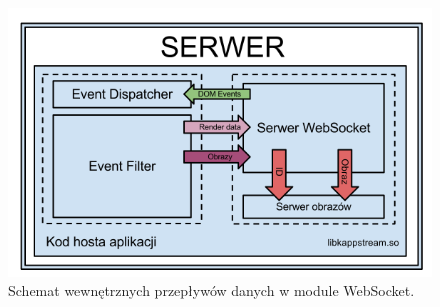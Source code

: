 
\begin{figure}[H]
\centering
\includegraphics[width=0.8\linewidth]{img/arch-lib}
\caption{Schemat wewnętrznych przepływów danych w module WebSocket.}
\label{fig:arch-lib}
\end{figure}
